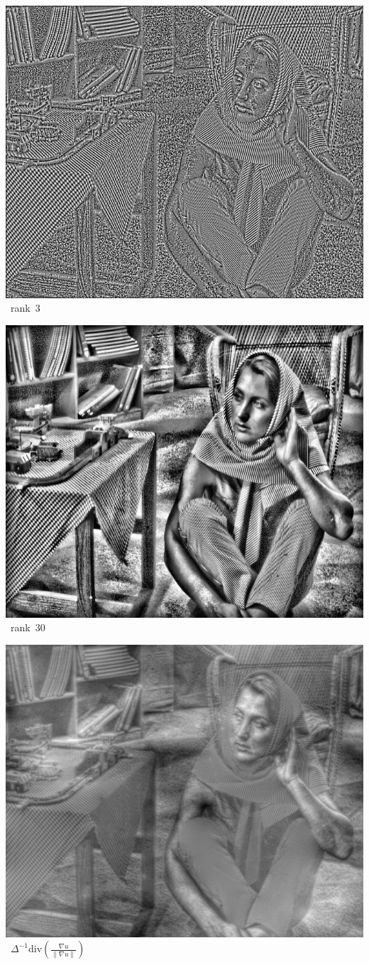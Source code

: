 \documentclass[12pt]{article}                  %
\begin{document}
\includegraphics[width=0.8\linewidth]{f/barbara_rank3.png}~rank~$3$

\includegraphics[width=0.8\linewidth]{f/barbara_rank30.png}~rank~$30$

\includegraphics[width=0.8\linewidth]{f/barbara_poisnor.png}~$\Delta^{-1}
\mathrm{div}\left(\frac{\nabla u}{\left\|\nabla u\right\|}\right)$
\end{document}
